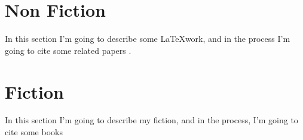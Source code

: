 \documentclass[12pt]{article}
\begin{document}
\section{Non Fiction}
In this section I'm going to describe some \LaTeX work, 
and in the process I'm going to cite some related
papers . 


\section{Fiction}
In this section I'm going to describe my fiction, and in the process, I'm going
to cite some books  


\nocite{*}
\renewcommand{\refname}{Complete List of Publications}
\end{document}
